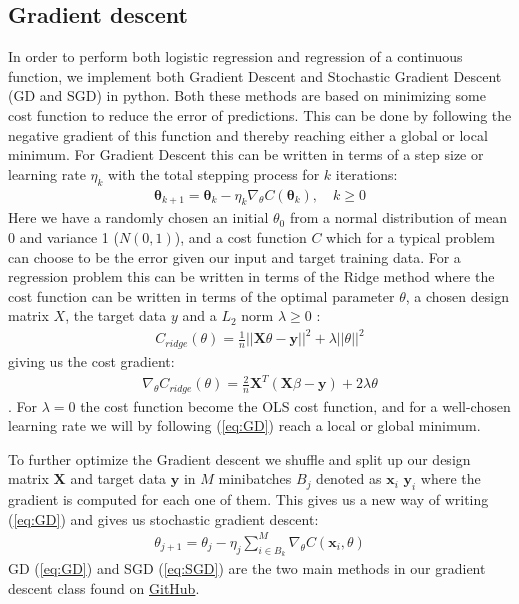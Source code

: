 \documentclass[11pt]{article}
\begin{document}
\subsection{Gradient descent}\label{sec:GD}
In order to perform both logistic regression and regression of a continuous function, we implement both Gradient Descent and Stochastic Gradient Descent (GD and SGD) in python. Both these methods are based on minimizing some cost function to reduce the error of predictions. This can be done by following the negative gradient of this function and thereby reaching either a global or local minimum. For Gradient Descent this can be written in terms of a step size or learning rate $\eta_k$ with the total stepping process for $k$ iterations:
\begin{align}
    \label{eq:GD}
    \boldsymbol{\theta}_{k+1} = \boldsymbol{\theta}_k - \eta_k \nabla_\theta C(\boldsymbol{\theta}_k),\quad k \geq 0
\end{align}
Here we have a randomly chosen an initial $\theta_0$ from a normal distribution of mean 0 and variance 1 ($N(0,1)$), and a cost function $C$ which for a typical problem can choose to be the error given our input and target training data. For a regression problem this can be written in terms of the Ridge method where the cost function can be written in terms of the optimal parameter $\theta$, a chosen design matrix $X$, the target data $y$ and a $L_2$ norm $\lambda \geq 0$ :
\begin{align*}
    C_{ridge}(\theta) = \frac{1 }{n }||\boldsymbol{X}\theta - \boldsymbol{y}||^2 + \lambda ||\theta||^2
\end{align*}
giving us the cost gradient:
\begin{align*}
    \nabla_\theta C_{ridge}(\theta) = \frac{2}{n}\boldsymbol{X}^T(\boldsymbol{X}\beta - \boldsymbol{y}) + 2\lambda \theta
\end{align*}.
For $\lambda=0$ the cost function become the OLS cost function, and for a well-chosen learning rate we will by following (\ref{eq:GD}) reach a local or global minimum.

To further optimize the Gradient descent we shuffle and split up our design matrix $\boldsymbol{X}$ and target data $\boldsymbol{y}$ in $M$ minibatches $B_j$ denoted as $\boldsymbol{x}_i$ $\boldsymbol{y}_i$ where the gradient is computed for each one of them. This gives us a new way of writing (\ref{eq:GD}) and gives us stochastic gradient descent:
\begin{align}
    \label{eq:SGD}
    \theta_{j+1} = \theta_j - \eta_j \sum_{i\in B_k}^M \nabla_\theta C(\boldsymbol{x}_i, \theta)
\end{align}
GD (\ref{eq:GD}) and SGD (\ref{eq:SGD}) are the two main methods in our gradient descent class found on \href{https://github.com/Fslippe/FYS-STK4155/tree/main/project2}{GitHub}.
\end{document}
